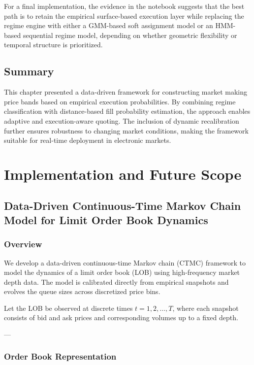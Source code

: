 \documentclass[12pt,a4paper]{report}
\begin{document}
For a final implementation, the evidence in the notebook suggests that the best path is to retain the empirical surface-based execution layer while replacing the regime engine with either a GMM-based soft assignment model or an HMM-based sequential regime model, depending on whether geometric flexibility or temporal structure is prioritized.

\section{Summary}

This chapter presented a data-driven framework for constructing market making price bands based on empirical execution probabilities. By combining regime classification with distance-based fill probability estimation, the approach enables adaptive and execution-aware quoting. The inclusion of dynamic recalibration further ensures robustness to changing market conditions, making the framework suitable for real-time deployment in electronic markets.



\chapter{Implementation and Future Scope}

\section{Data-Driven Continuous-Time Markov Chain Model for Limit Order Book Dynamics}

\subsection{Overview}

We develop a data-driven continuous-time Markov chain (CTMC) framework to model the dynamics of a limit order book (LOB) using high-frequency market depth data. The model is calibrated directly from empirical snapshots and evolves the queue sizes across discretized price bins.

Let the LOB be observed at discrete times $t = 1, 2, \dots, T$, where each snapshot consists of bid and ask prices and corresponding volumes up to a fixed depth.

---

\subsection{Order Book Representation}
\end{document}
